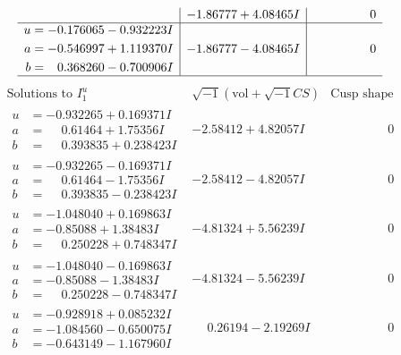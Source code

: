 \documentclass[1p]{elsarticle_modified}
\theoremstyle{definition}
\newcommand{\I}{\sqrt{-1}}
\begin{document}
$$\begin{array}{c|c|c}
 & -1.86777 + 4.08465 I & \phantom{-0.000000 } 0 \\ \hline\begin{aligned}
u &= -0.176065 - 0.932223 I \\
a &= -0.546997 + 1.119370 I \\
b &= \phantom{-}0.368260 - 0.700906 I\end{aligned}
 & -1.86777 - 4.08465 I & \phantom{-0.000000 } 0\\
 \hline 
 \end{array}$$\newpage$$\begin{array}{c|c|c}  
\text{Solutions to }I^u_{1}& \I (\text{vol} + \sqrt{-1}CS) & \text{Cusp shape}\\
 \hline 
\begin{aligned}
u &= -0.932265 + 0.169371 I \\
a &= \phantom{-}0.61464 + 1.75356 I \\
b &= \phantom{-}0.393835 + 0.238423 I\end{aligned}
 & -2.58412 + 4.82057 I & \phantom{-0.000000 } 0 \\ \hline\begin{aligned}
u &= -0.932265 - 0.169371 I \\
a &= \phantom{-}0.61464 - 1.75356 I \\
b &= \phantom{-}0.393835 - 0.238423 I\end{aligned}
 & -2.58412 - 4.82057 I & \phantom{-0.000000 } 0 \\ \hline\begin{aligned}
u &= -1.048040 + 0.169863 I \\
a &= -0.85088 + 1.38483 I \\
b &= \phantom{-}0.250228 + 0.748347 I\end{aligned}
 & -4.81324 + 5.56239 I & \phantom{-0.000000 } 0 \\ \hline\begin{aligned}
u &= -1.048040 - 0.169863 I \\
a &= -0.85088 - 1.38483 I \\
b &= \phantom{-}0.250228 - 0.748347 I\end{aligned}
 & -4.81324 - 5.56239 I & \phantom{-0.000000 } 0 \\ \hline\begin{aligned}
u &= -0.928918 + 0.085232 I \\
a &= -1.084560 - 0.650075 I \\
b &= -0.643149 - 1.167960 I\end{aligned}
 & \phantom{-}0.26194 - 2.19269 I & \phantom{-0.000000 } 0 \\ \hline\begin{aligned}

\end{aligned}
\end{array}$$
\end{document}
